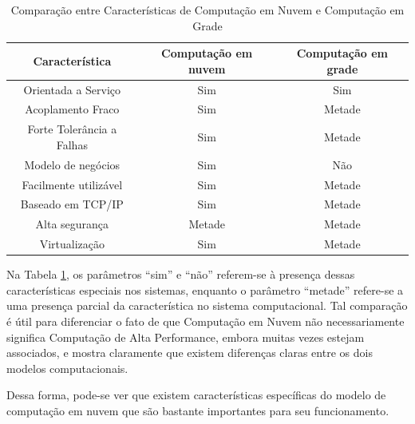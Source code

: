 \documentclass[
	12pt,				%
	a4paper,			%
	english,			%
	french,				%
	spanish,			%
	brazil				%
	]{abntex2}
\begin{document}
\begin{table}[H]
    \ABNTEXchapterfont
    \centering
    \caption{Comparação entre Características de Computação em Nuvem e Computação em Grade}
    \begin{tabular}{|c|c|c|}
    \hline
        \textbf{Característica} & \textbf{Computação em nuvem}  & \textbf{Computação em grade}\\
        \hline
        \hline
        Orientada a Serviço & Sim  & Sim\\
        \hline
        Acoplamento Fraco & Sim  & Metade\\
        \hline
        Forte Tolerância a Falhas & Sim  & Metade\\
        \hline
        Modelo de negócios & Sim  & Não\\
        \hline
        Facilmente utilizável & Sim  & Metade \\
        \hline
        Baseado em TCP/IP & Sim & Metade\\
        \hline
        Alta segurança & Metade  & Metade\\
        \hline
        Virtualização & Sim  & Metade\\
    \hline
    \end{tabular}
    \label{tab:comparacao}
\end{table}

Na Tabela \ref{tab:comparacao}, os parâmetros ``sim'' e ``não'' referem-se à presença dessas características especiais nos sistemas, enquanto o parâmetro ``metade'' refere-se a uma presença parcial da característica no sistema computacional. Tal comparação é útil para diferenciar o fato de que Computação em Nuvem não necessariamente significa Computação de Alta Performance, embora muitas vezes estejam associados, e mostra claramente que existem diferenças claras entre os dois modelos computacionais.

Dessa forma, pode-se ver que existem características específicas do modelo de computação em nuvem que são bastante importantes para seu funcionamento.
\end{document}
